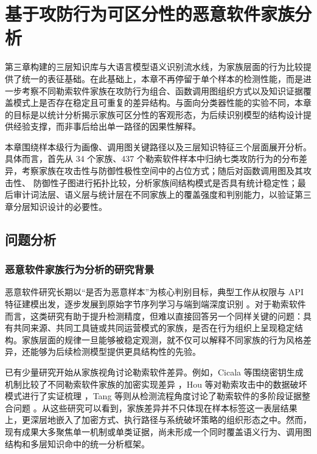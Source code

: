 \setcounter{section}{3}

\section{基于攻防行为可区分性的恶意软件家族分析}
\label{sec:family-analysis}

第三章构建的三层知识库与大语言模型语义识别流水线，为家族层面的行为比较提供了统一的表征基础。在此基础上，本章不再停留于单个样本的检测性能，而是进一步考察不同勒索软件家族在攻防行为组合、函数调用图组织方式以及知识证据覆盖模式上是否存在稳定且可重复的差异结构。与面向分类器性能的实验不同，本章的目标是以统计分析揭示家族可区分性的客观形态，为后续识别模型的结构设计提供经验支撑，而非事后给出单一路径的因果性解释。

本章围绕样本级行为画像、调用图关键路径以及三层知识特征三个层面展开分析。具体而言，首先从 34 个家族、437 个勒索软件样本中归纳七类攻防行为的分布差异，考察家族在攻击性与防御性极性空间中的占位方式；随后对函数调用图及其攻击性、 防御性子图进行拓扑比较，分析家族间结构模式是否具有统计稳定性；最后审计词法层、语义层与统计层在不同家族上的覆盖强度和判别能力，以验证第三章分层知识设计的必要性。

\subsection{问题分析}

\subsubsection{恶意软件家族行为分析的研究背景}

恶意软件研究长期以“是否为恶意样本”为核心判别目标，典型工作从权限与 API 特征建模出发，逐步发展到原始字节序列学习与端到端深度识别 \cite{arp2014drebin,raff2017learning}。对于勒索软件而言，这类研究有助于提升检测精度，但难以直接回答另一个同样关键的问题：具有共同来源、共同工具链或共同运营模式的家族，是否在行为组织上呈现稳定结构。家族层面的规律一旦能够被稳定观测，就不仅可以解释不同家族的行为风格差异，还能够为后续检测模型提供更具结构性的先验。

已有少量研究开始从家族视角讨论勒索软件差异。例如，Cicala 等围绕密钥生成机制比较了不同勒索软件家族的加密实现差异 \cite{cicala2020analysis}，Hou 等对勒索攻击中的数据破坏模式进行了实证梳理 \cite{hou2024empirical}，Tang 等则从检测流程角度讨论了勒索软件的多阶段证据整合问题 \cite{tang2020ransomspector}。从这些研究可以看到，家族差异并不只体现在样本标签这一表层结果上，更深层地嵌入了加密方式、执行路径与系统破坏策略的组织形态之中。然而，现有成果大多聚焦单一机制或单类证据，尚未形成一个同时覆盖语义行为、调用图结构和多层知识命中的统一分析框架。

